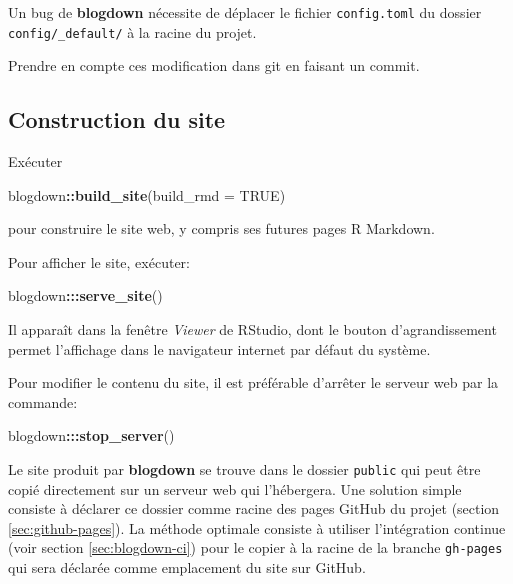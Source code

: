 \documentclass[
  12pt,
  french,
  a4paper,
  extrafontsizes,onecolumn,openright
  ]{memoir}
\newenvironment{Shaded}{\begin{snugshade}}{\end{snugshade}}
\newcommand{\AttributeTok}[1]{\textcolor[rgb]{0.13,0.29,0.53}{#1}}
\newcommand{\ConstantTok}[1]{\textcolor[rgb]{0.56,0.35,0.01}{#1}}
\newcommand{\FunctionTok}[1]{\textcolor[rgb]{0.13,0.29,0.53}{\textbf{#1}}}
\newcommand{\NormalTok}[1]{#1}
\newcommand{\SpecialCharTok}[1]{\textcolor[rgb]{0.81,0.36,0.00}{\textbf{#1}}}
\begin{document}
Un bug de \textbf{blogdown} nécessite de déplacer le fichier \texttt{config.toml} du dossier \texttt{config/\_default/} à la racine du projet.

Prendre en compte ces modification dans git en faisant un commit.

\subsection{Construction du site}\label{construction-du-site}

Exécuter

\scriptsize

\begin{Shaded}
\begin{Highlighting}[]
\NormalTok{blogdown}\SpecialCharTok{::}\FunctionTok{build\_site}\NormalTok{(}\AttributeTok{build\_rmd =} \ConstantTok{TRUE}\NormalTok{)}
\end{Highlighting}
\end{Shaded}

\normalsize

pour construire le site web, y compris ses futures pages R Markdown.

Pour afficher le site, exécuter:

\scriptsize

\begin{Shaded}
\begin{Highlighting}[]
\NormalTok{blogdown}\SpecialCharTok{:::}\FunctionTok{serve\_site}\NormalTok{()}
\end{Highlighting}
\end{Shaded}

\normalsize

Il apparaît dans la fenêtre \emph{Viewer} de RStudio, dont le bouton d'agrandissement permet l'affichage dans le navigateur internet par défaut du système.

Pour modifier le contenu du site, il est préférable d'arrêter le serveur web par la commande:

\scriptsize

\begin{Shaded}
\begin{Highlighting}[]
\NormalTok{blogdown}\SpecialCharTok{:::}\FunctionTok{stop\_server}\NormalTok{()}
\end{Highlighting}
\end{Shaded}

\normalsize

Le site produit par \textbf{blogdown} se trouve dans le dossier \texttt{public} qui peut être copié directement sur un serveur web qui l'hébergera.
Une solution simple consiste à déclarer ce dossier comme racine des pages GitHub du projet
(section \ref{sec:github-pages}).
La méthode optimale consiste à utiliser l'intégration continue (voir section \ref{sec:blogdown-ci}) pour le copier à la racine de la branche \texttt{gh-pages} qui sera déclarée comme emplacement du site sur GitHub.
\end{document}

